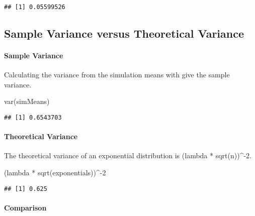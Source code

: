 \documentclass[
]{article}
\newenvironment{Shaded}{\begin{snugshade}}{\end{snugshade}}
\newcommand{\DecValTok}[1]{\textcolor[rgb]{0.00,0.00,0.81}{#1}}
\newcommand{\FunctionTok}[1]{\textcolor[rgb]{0.00,0.00,0.00}{#1}}
\newcommand{\NormalTok}[1]{#1}
\newcommand{\SpecialCharTok}[1]{\textcolor[rgb]{0.00,0.00,0.00}{#1}}
\begin{document}
\begin{verbatim}
## [1] 0.05599526
\end{verbatim}

\hypertarget{sample-variance-versus-theoretical-variance}{%
\subsection{Sample Variance versus Theoretical
Variance}\label{sample-variance-versus-theoretical-variance}}

\hypertarget{sample-variance}{%
\paragraph{Sample Variance}\label{sample-variance}}

Calculating the variance from the simulation means with give the sample
variance.

\begin{Shaded}
\begin{Highlighting}[]
\FunctionTok{var}\NormalTok{(simMeans)}
\end{Highlighting}
\end{Shaded}

\begin{verbatim}
## [1] 0.6543703
\end{verbatim}

\hypertarget{theoretical-variance}{%
\paragraph{Theoretical Variance}\label{theoretical-variance}}

The theoretical variance of an exponential distribution is (lambda *
sqrt(n))\^{}-2.

\begin{Shaded}
\begin{Highlighting}[]
\NormalTok{(lambda }\SpecialCharTok{*} \FunctionTok{sqrt}\NormalTok{(exponentials))}\SpecialCharTok{\^{}{-}}\DecValTok{2}
\end{Highlighting}
\end{Shaded}

\begin{verbatim}
## [1] 0.625
\end{verbatim}

\hypertarget{comparison-1}{%
\paragraph{Comparison}\label{comparison-1}}
\end{document}
